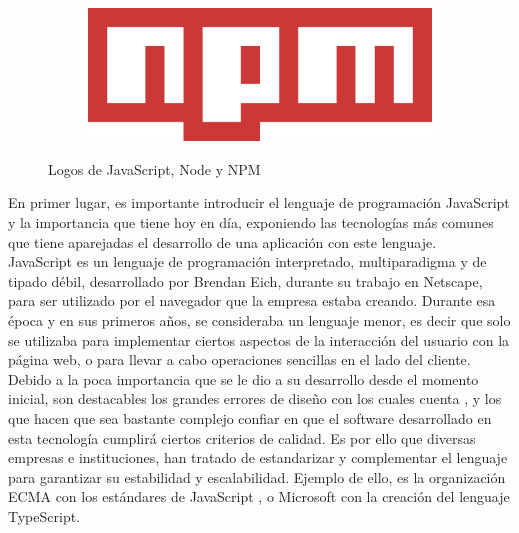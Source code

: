 \begin{figure}[ht]
\begin{subfigure}[b]{0.15\textwidth}
        \label{fig:node}
    \end{subfigure}
    ~ %
    \begin{subfigure}[b]{0.15\textwidth}
        \includegraphics[width=\textwidth]{mem/images/cap-4/4.1.1(JS)/npm-logo.png}
        \label{fig:npm}
    \end{subfigure}
    \caption{Logos de JavaScript, Node y NPM}\label{fig:animals}
\end{figure}

En primer lugar, es importante introducir el lenguaje de programación JavaScript y la importancia que tiene hoy en día, exponiendo las tecnologías más comunes que tiene aparejadas el desarrollo de una aplicación con este lenguaje. \\

JavaScript es un lenguaje de programación interpretado, multiparadigma y de tipado débil, desarrollado por Brendan Eich, durante su trabajo en Netscape, para ser utilizado por el navegador que la empresa estaba creando. Durante esa época y en sus primeros años, se consideraba un lenguaje menor, es decir que solo se utilizaba para implementar ciertos aspectos de la interacción del usuario con la página web, o para llevar a cabo operaciones sencillas en el lado del cliente. \\

Debido a la poca importancia que se le dio a su desarrollo desde el momento inicial, son destacables los grandes errores de diseño con los cuales cuenta \cite{KennethEng2019}, y los que hacen que sea bastante complejo confiar en que el software desarrollado en esta tecnología cumplirá ciertos criterios de calidad. Es por ello que diversas empresas e instituciones, han tratado de estandarizar y complementar el lenguaje para garantizar su estabilidad y escalabilidad. Ejemplo de ello, es la organización ECMA con los estándares de JavaScript \cite{ecmascript}, o Microsoft con la creación del lenguaje TypeScript.\\

